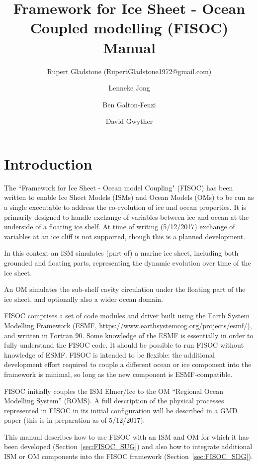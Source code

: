 \documentclass[12pt]{article}
\begin{document}
\title{Framework for Ice Sheet - Ocean Coupled modelling (FISOC) Manual}
\author{Rupert Gladstone (RupertGladstone1972@gmail.com) \and Lenneke Jong \and Ben Galton-Fenzi \and David Gwyther}
\maketitle

\newpage 
\tableofcontents
\newpage 

\section{Introduction}

The ``Framework for Ice Sheet - Ocean model Coupling" (FISOC) has been written to enable Ice Sheet Models 
(ISMs) and Ocean Models (OMs) to be run as a single executable to address the co-evolution of ice and ocean 
properties.  
It is primarily designed to handle exchange of variables between ice and ocean at the underside of a floating ice shelf.
At time of writing (5/12/2017) exchange of variables at an ice cliff is 
not supported, though this is a planned development.

In this context an ISM simulates (part of) a marine ice sheet, including both grounded and floating parts, 
representing the dynamic evolution over time of the ice sheet.

An OM simulates the sub-shelf cavity circulation under the floating part of the ice sheet, and optionally also 
a wider ocean domain.

FISOC comprises a set of code modules and driver built using the Earth System Modelling Framework (ESMF, 
\url{https://www.earthsystemcog.org/projects/esmf/}), and written in Fortran 90. 
Some knowledge of the ESMF is essentially in order to fully understand the FISOC code.  It should 
be possible to run FISOC without knowledge of ESMF.
FISOC is intended to be flexible: the additional development effort required to 
couple a different ocean or ice component into the framework is minimal, so 
long as the new component is ESMF-compatible. 

FISOC initially couples the ISM Elmer/Ice to the OM ``Regional Ocean Modelling System'' (ROMS).
A full description of the physical processes represented in FISOC in its 
initial configuration will be described in a GMD paper (this is in 
preparation as of 5/12/2017).

This manual describes how to use FISOC with an ISM and OM for which it has been 
developed (Section~\ref{sec:FISOC_SUG}) and also how to integrate 
additional ISM or OM components 
into the FISOC framework (Section~\ref{sec:FISOC_SDG}).
\end{document}
